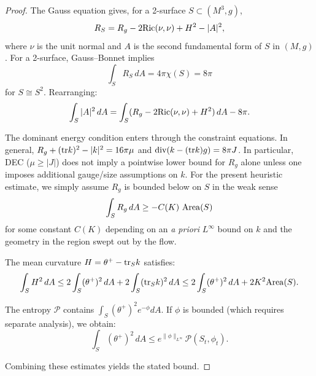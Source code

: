 \begin{proof}
The Gauss equation gives, for a 2-surface $S\subset (M^3,g)$,
\begin{equation}
R_S = R_g - 2\mathrm{Ric}(\nu,\nu) + H^2 - |A|^2,
\end{equation}
where $\nu$ is the unit normal and $A$ is the second fundamental form of $S$ in $(M,g)$.
For a 2-surface, Gauss--Bonnet implies
\begin{equation}
\int_S R_S \, dA = 4\pi \chi(S) = 8\pi
\end{equation}
for $S \cong S^2$. Rearranging:
\begin{equation}
\int_S |A|^2 \, dA = \int_S (R_g - 2\mathrm{Ric}(\nu,\nu) + H^2) \, dA - 8\pi.
\end{equation}

The dominant energy condition enters through the constraint equations. In general,
$R_g + (\mathrm{tr} k)^2 - |k|^2 = 16\pi\mu$ and $\mathrm{div}(k-(\mathrm{tr} k)g)=8\pi J$.
In particular, DEC ($\mu\ge |J|$) does not imply a pointwise lower bound for $R_g$ alone unless one imposes additional gauge/size assumptions on $k$.
For the present heuristic estimate, we simply assume $R_g$ is bounded below on $S$ in the weak sense
\begin{equation}
\int_S R_g\,dA \ge -C(K)\,\operatorname{Area}(S)
\end{equation}
for some constant $C(K)$ depending on an \emph{a priori} $L^\infty$ bound on $k$ and the geometry in the region swept out by the flow.

The mean curvature $H = \theta^+ - \mathrm{tr}_S k$ satisfies:
\begin{equation}
\int_S H^2 \, dA \leq 2\int_S (\theta^+)^2 \, dA + 2\int_S (\mathrm{tr}_S k)^2 \, dA \leq 2\int_S (\theta^+)^2 \, dA + 2K^2 \mathrm{Area}(S).
\end{equation}

The entropy $\mathcal{P}$ contains $\int_S (\theta^+)^2 e^{-\phi} dA$. If $\phi$ is bounded (which requires separate analysis), we obtain:
\begin{equation}
\int_S (\theta^+)^2 \, dA \leq e^{\|\phi\|_{L^\infty}} \mathcal{P}(S_t, \phi_t).
\end{equation}

Combining these estimates yields the stated bound.
\end{proof}

